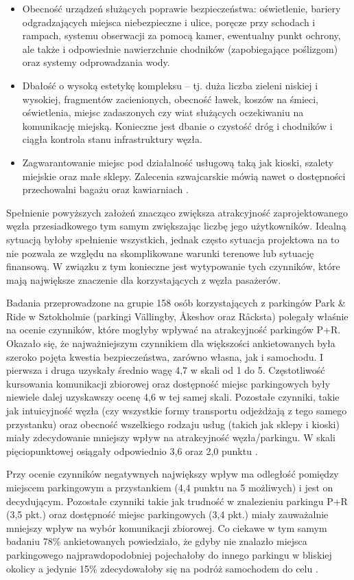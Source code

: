 \documentclass[twoside,12pt]{article}
\begin{document}
\begin{itemize}
		\item Obecność urządzeń służących poprawie bezpieczeństwa: oświetlenie, bariery odgradzających miejsca niebezpieczne i ulice, poręcze przy schodach i rampach, systemu obserwacji za pomocą kamer, ewentualny punkt ochrony, ale także i odpowiednie nawierzchnie chodników (zapobiegające poślizgom) oraz systemy odprowadzania wody. 
		\item Dbałość o wysoką estetykę kompleksu -- tj. duża liczba zieleni niskiej i wysokiej, fragmentów zacienionych, obecność ławek, koszów na śmieci, oświetlenia, miejsc zadaszonych czy wiat służących oczekiwaniu na komunikację miejską. Konieczne jest dbanie o czystość dróg i chodników i ciągła kontrola stanu infrastruktury węzła.
		\item Zagwarantowanie miejsc pod działalność usługową taką jak kioski, szalety miejskie oraz małe sklepy. Zalecenia szwajcarskie mówią nawet o dostępności przechowalni bagażu oraz kawiarniach \cite{standardy_szwajcarskie}.
	\end{itemize}	 
	
	Spełnienie powyższych założeń znacząco zwiększa atrakcyjność zaprojektowanego węzła przesiadkowego tym samym zwiększając liczbę jego użytkowników. Idealną sytuacją byłoby spełnienie wszystkich, jednak często sytuacja projektowa na to nie pozwala ze względu na skomplikowane warunki terenowe lub sytuację finansową. W związku z tym konieczne jest wytypowanie tych czynników, które mają największe znaczenie dla korzystających z węzła pasażerów. 
	
	Badania przeprowadzone na grupie 158 osób korzystających z parkingów Park \& Ride w Sztokholmie (parkingi Vällingby, Åkeshov oraz Råcksta) polegały właśnie na ocenie czynników, które mogłyby wpływać na atrakcyjność parkingów P+R. Okazało się, że najważniejszym czynnikiem dla większości ankietowanych była szeroko pojęta kwestia bezpieczeństwa, zarówno własna, jak i samochodu. I pierwsza i druga  uzyskały średnio wagę 4,7 w skali od 1 do 5. Częstotliwość kursowania komunikacji zbiorowej oraz dostępność miejsc parkingowych były niewiele dalej uzyskawszy ocenę 4,6 w tej samej skali. Pozostałe czynniki, takie jak intuicyjność węzła (czy wszystkie formy transportu odjeżdżają z tego samego przystanku) oraz obecność wszelkiego rodzaju usług (takich jak sklepy i kioski) miały zdecydowanie mniejszy wpływ na atrakcyjność węzła/parkingu. W skali pięciopunktowej osiągały odpowiednio 3,6 oraz 2,0 punktu \cite{olsson}.
		
	Przy ocenie czynników negatywnych największy wpływ ma odległość pomiędzy miejscem parkingowym a przystankiem (4,4 punktu na 5 możliwych) i jest on decydującym. Pozostałe czynniki takie jak trudność w znalezieniu parkingu P+R (3,5 pkt.) oraz dostępność miejsc parkingowych (3,4 pkt.) miały zauważalnie mniejszy wpływ na wybór komunikacji zbiorowej. Co ciekawe w tym samym badaniu 78\% ankietowanych powiedziało, że gdyby nie znalazło miejsca parkingowego najprawdopodobniej pojechałoby do innego parkingu w bliskiej okolicy a jedynie 15\% zdecydowałoby się na podróż samochodem do celu \cite{olsson}.
		
\end{document}
